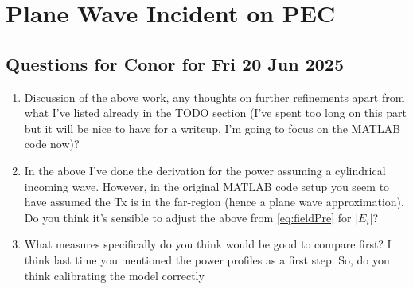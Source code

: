 \documentclass{article}
\begin{document}
\section{Plane Wave Incident on PEC}
\subsection{Questions for Conor for Fri 20 Jun 2025}
\begin{enumerate}
   \item Discussion of the above work, any thoughts on further refinements apart from
      what I've listed already in the TODO section (I've spent too long on this part
      but it will be nice to have for a writeup. I'm going to focus on the MATLAB
      code now)?
   \item In the above I've done the derivation for the power assuming a cylindrical
      incoming wave. However, in the original MATLAB code setup you seem to have
      assumed the Tx is in the far-region (hence a plane wave approximation). Do you
      think it's sensible to adjust the above from \eqref{eq:fieldPre} for $|E_i|$?
   \item What measures specifically do you think would be good to compare first? I
      think last time you mentioned the power profiles as a first step. So, do you
      think calibrating the model correctly 
\end{enumerate}
\end{document}
